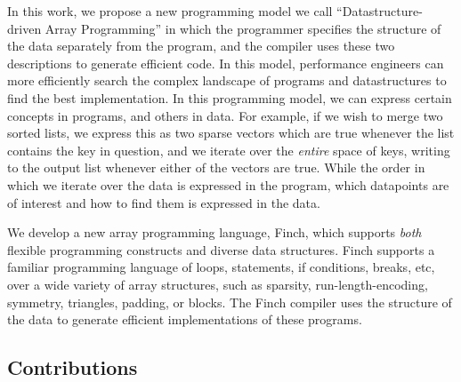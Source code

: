 In this work, we propose a new programming model we call ``Datastructure-driven Array Programming'' in which the programmer specifies the structure of the data separately from the program, and the compiler uses these two descriptions to generate efficient code. In this model, performance engineers can more efficiently search the
complex landscape of programs and datastructures to find the best implementation. In this programming model, we can express certain concepts in programs, and others in data. For example, if we wish to merge two sorted lists, we express this as two sparse vectors which are true whenever the list contains the key in question, and we iterate over the \textit{entire} space of keys, writing to the output list whenever either of the vectors are true.
While the order in which we iterate over the data is expressed in the program, which datapoints are of interest and how to find them is expressed in the data.

We develop a new array programming language, Finch, which supports \textit{both}
flexible programming constructs and diverse data structures. Finch supports a
familiar programming language of loops, statements, if conditions, breaks, etc,
over a wide variety of array structures, such as sparsity, run-length-encoding,
symmetry, triangles, padding, or blocks. The Finch compiler uses the structure
of the data to generate efficient implementations of these programs.

\subsection{Contributions}

